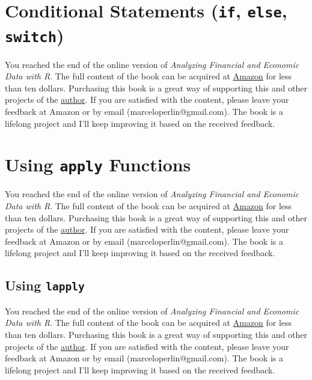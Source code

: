 \documentclass[
  12pt,
]{book}
\newenvironment{pleasebuyit}
{\begin{noteblock}
		
	} {\end{noteblock}}
\begin{document}
\hypertarget{conditional-statements-if-else-switch}{%
\section{\texorpdfstring{Conditional Statements (\texttt{if}, \texttt{else}, \texttt{switch})}{Conditional Statements (if, else, switch)}}\label{conditional-statements-if-else-switch}}

\begin{pleasebuyit}
You reached the end of the online version of \emph{Analyzing Financial
and Economic Data with R}. The full content of the book can be acquired
at \href{https://www.amazon.com/dp/B084LSNXMN}{Amazon} for less than ten
dollars. Purchasing this book is a great way of supporting this and
other projects of the \href{https://www.msperlin.com/}{author}. If you
are satisfied with the content, please leave your feedback at Amazon or
by email (marceloperlin@gmail.com). The book is a lifelong project and
I'll keep improving it based on the received feedback.
\end{pleasebuyit}

\hypertarget{using-apply-functions}{%
\section{\texorpdfstring{Using \texttt{apply} Functions}{Using apply Functions}}\label{using-apply-functions}}

\begin{pleasebuyit}
You reached the end of the online version of \emph{Analyzing Financial
and Economic Data with R}. The full content of the book can be acquired
at \href{https://www.amazon.com/dp/B084LSNXMN}{Amazon} for less than ten
dollars. Purchasing this book is a great way of supporting this and
other projects of the \href{https://www.msperlin.com/}{author}. If you
are satisfied with the content, please leave your feedback at Amazon or
by email (marceloperlin@gmail.com). The book is a lifelong project and
I'll keep improving it based on the received feedback.
\end{pleasebuyit}

\hypertarget{using-lapply}{%
\subsection{\texorpdfstring{Using \texttt{lapply}}{Using lapply}}\label{using-lapply}}

\begin{pleasebuyit}
You reached the end of the online version of \emph{Analyzing Financial
and Economic Data with R}. The full content of the book can be acquired
at \href{https://www.amazon.com/dp/B084LSNXMN}{Amazon} for less than ten
dollars. Purchasing this book is a great way of supporting this and
other projects of the \href{https://www.msperlin.com/}{author}. If you
are satisfied with the content, please leave your feedback at Amazon or
by email (marceloperlin@gmail.com). The book is a lifelong project and
I'll keep improving it based on the received feedback.
\end{pleasebuyit}
\end{document}
